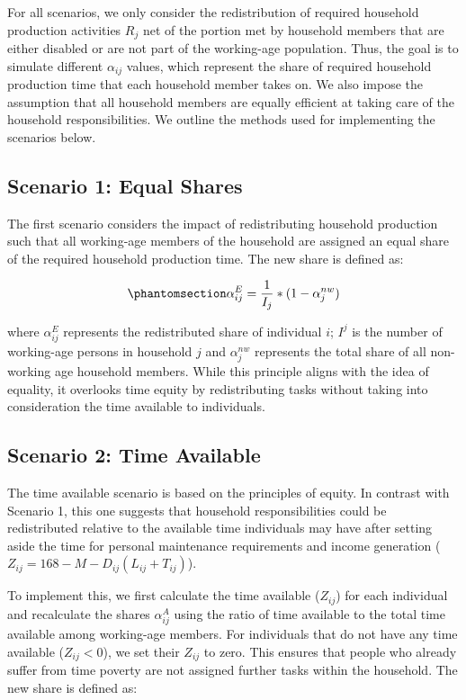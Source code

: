 \documentclass[
  11pt,
]{article}
\begin{document}
For all scenarios, we only consider the redistribution of required
household production activities \(R_j\) net of the portion met by
household members that are either disabled or are not part of the
working-age population. Thus, the goal is to simulate different
\(\alpha_{ij}\) values, which represent the share of required household
production time that each household member takes on. We also impose the
assumption that all household members are equally efficient at taking
care of the household responsibilities. We outline the methods used for
implementing the scenarios below.

\subsection{Scenario 1: Equal Shares}\label{scenario-1-equal-shares}

The first scenario considers the impact of redistributing household
production such that all working-age members of the household are
assigned an equal share of the required household production time. The
new share is defined as:

\begin{equation}\phantomsection\label{eq-r1}{\alpha_{ij}^E= \frac{1}{I_j}*(1-\alpha_{j}^{nw})
}\end{equation}

where \(\alpha_{ij}^E\) represents the redistributed share of individual
\(i\); \(I^j\) is the number of working-age persons in household \(j\)
and \(\alpha_{j}^{nw}\) represents the total share of all non-working
age household members. While this principle aligns with the idea of
equality, it overlooks time equity by redistributing tasks without
taking into consideration the time available to individuals.

\subsection{Scenario 2: Time Available}\label{scenario-2-time-available}

The time available scenario is based on the principles of equity. In
contrast with Scenario 1, this one suggests that household
responsibilities could be redistributed relative to the available time
individuals may have after setting aside the time for personal
maintenance requirements and income generation
(\(Z_{ij}=168-M-D_{ij}(L_{ij}+T_{ij})\)).

To implement this, we first calculate the time available (\(Z_{ij}\))
for each individual and recalculate the shares \(\alpha_{ij}^A\) using
the ratio of time available to the total time available among
working-age members. For individuals that do not have any time available
(\(Z_{ij}<0\)), we set their \(Z_{ij}\) to zero. This ensures that
people who already suffer from time poverty are not assigned further
tasks within the household. The new share is defined as:
\end{document}
